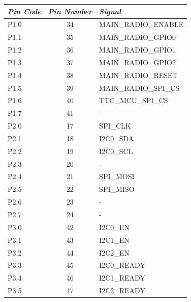 \begin{longtable}{lcl}
    \toprule[1.5pt]
    \textit{Pin Code} & \textit{Pin Number} & \textit{Signal}       \\
    \midrule
    P1.0              & 34                  & MAIN\_RADIO\_ENABLE   \\
    P1.1              & 35                  & MAIN\_RADIO\_GPIO0    \\
    P1.2              & 36                  & MAIN\_RADIO\_GPIO1    \\
    P1.3              & 37                  & MAIN\_RADIO\_GPIO2    \\
    P1.4              & 38                  & MAIN\_RADIO\_RESET    \\
    P1.5              & 39                  & MAIN\_RADIO\_SPI\_CS  \\
    P1.6              & 40                  & TTC\_MCU\_SPI\_CS     \\
    P1.7              & 41                  & -                     \\
    \midrule
    P2.0              & 17                  & SPI\_CLK              \\
    P2.1              & 18                  & I2C0\_SDA             \\
    P2.2              & 19                  & I2C0\_SCL             \\
    P2.3              & 20                  & -                     \\
    P2.4              & 21                  & SPI\_MOSI             \\
    P2.5              & 22                  & SPI\_MISO             \\
    P2.6              & 23                  & -                     \\
    P2.7              & 24                  & -                     \\
    \midrule
    P3.0              & 42                  & I2C0\_EN              \\
    P3.1              & 43                  & I2C1\_EN              \\
    P3.2              & 44                  & I2C2\_EN              \\
    P3.3              & 45                  & I2C0\_READY           \\
    P3.4              & 46                  & I2C1\_READY           \\
    P3.5              & 47                  & I2C2\_READY           \\

\end{longtable}
